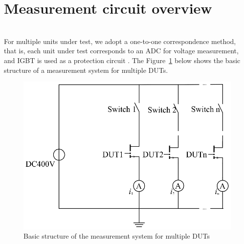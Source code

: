 \section{Measurement circuit overview}
\label{sec:Measurement circuit overview}
\\
For multiple units under test, we adopt a one-to-one correspondence method, that is, each unit under test corresponds to an ADC for voltage measurement, and IGBT is used as a protection circuit \cite{kim2011novel}.
The Figure~\ref{fig:3.1} below shows the basic structure of a measurement system for multiple DUTs.
\\
\begin{figure}[!ht]
	\centering
	\includegraphics[width=15cm]{grafiken/3.1.eps}
	\caption{Basic structure of the measurement system for multiple DUTs} 
	\label{fig:3.1}
\end{figure}
\FloatBarrier
\\
\\
